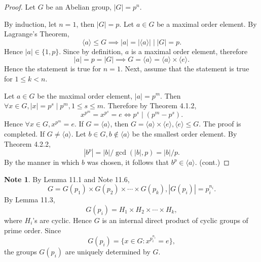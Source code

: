 \documentclass{article}
\newtheorem{lemma}{Lemma}[section]
\theoremstyle{definition}
\newtheorem{note}{Note}[section]
\begin{document}
    \begin{proof}
       Let $G$ be an Abelian group, $|G|=p^n$.
       
       By induction, let $n=1$, then $|G|=p$. Let $a\in G$ be a maximal order element. By Lagrange's Theorem,
       \begin{equation*}
           \langle a \rangle \leq G \implies |a|=|\langle a \rangle| \mid |G| = p.
       \end{equation*}
       Hence $|a|\in\{1,p\}$. Since by definition, $a$ is a maximal order element, therefore 
       \begin{equation*}
           |a|=p=|G| \implies G=\langle a \rangle=\langle a\rangle\times\langle e\rangle.
       \end{equation*}
       Hence the statement is true for $n=1$. Next, assume that the statement is true for $1\leq k<n$.
       
       Let $a\in G$ be the maximal order element, $|a|=p^m$. Then $\forall x \in G, |x|=p^s\mid p^m,1\leq s\leq m$. Therefore by Theorem 4.1.2,
       \begin{equation*}
           x^{p^m}=x^{p^s}=e \iff p^s\mid(p^m-p^s).
       \end{equation*}
       Hence $\forall x \in G, x^{p^m}=e$. If $G=\langle a\rangle$, then $G=\langle a \rangle \times \langle e \rangle, \langle e \rangle\leq G$. The proof is completed. If $G\neq\langle a\rangle$. Let $b\in G, b \notin \langle a\rangle$ be the smallest order element. By Theorem 4.2.2,
       \begin{equation*}
           |b^p|=|b|/\gcd(|b|,p)=|b|/p.
       \end{equation*}
       By the manner in which $b$ was chosen, it follows that $b^p \in \langle a \rangle$.
       (cont.)
    \end{proof}
    
    \noindent{}
    
    \begin{note}
        By Lemma 11.1 and Note 11.6,
        \begin{equation*}
            G=G(p_1)\times G(p_2)\times\cdots\times G(p_k), |G(p_i)|=p_i^{n_i}.
        \end{equation*}
        By Lemma 11.3,
        \begin{equation*}
            G(p_i)=H_1 \times H_2 \times \cdots \times H_k,
        \end{equation*}
        where $H_i$'s are cyclic. Hence $G$ is an internal direct product of cyclic groups of prime order. Since 
        \begin{equation*}
            G(p_i)=\{x\in G: x^{p_i^{n_i}}=e\},
        \end{equation*}
        the groups $G(p_i)$ are uniquely determined by $G$.
    \end{note}
    
\end{document}
